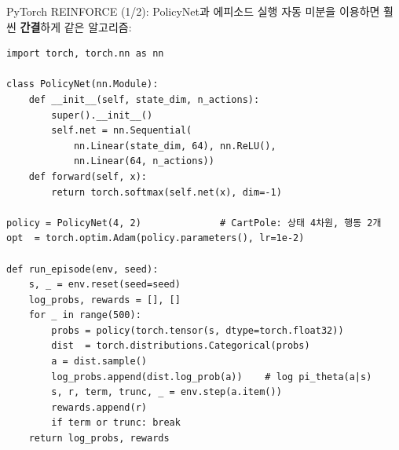 \begin{frame}[fragile]{PyTorch REINFORCE (1/2): PolicyNet과 에피소드 실행}
  자동 미분을 이용하면 훨씬 \textbf{간결}하게 같은 알고리즘:
\begin{lstlisting}
import torch, torch.nn as nn

class PolicyNet(nn.Module):
    def __init__(self, state_dim, n_actions):
        super().__init__()
        self.net = nn.Sequential(
            nn.Linear(state_dim, 64), nn.ReLU(),
            nn.Linear(64, n_actions))
    def forward(self, x):
        return torch.softmax(self.net(x), dim=-1)

policy = PolicyNet(4, 2)              # CartPole: 상태 4차원, 행동 2개
opt  = torch.optim.Adam(policy.parameters(), lr=1e-2)

def run_episode(env, seed):
    s, _ = env.reset(seed=seed)
    log_probs, rewards = [], []
    for _ in range(500):
        probs = policy(torch.tensor(s, dtype=torch.float32))
        dist  = torch.distributions.Categorical(probs)
        a = dist.sample()
        log_probs.append(dist.log_prob(a))    # log pi_theta(a|s)
        s, r, term, trunc, _ = env.step(a.item())
        rewards.append(r)
        if term or trunc: break
    return log_probs, rewards
\end{lstlisting}
\end{frame}
